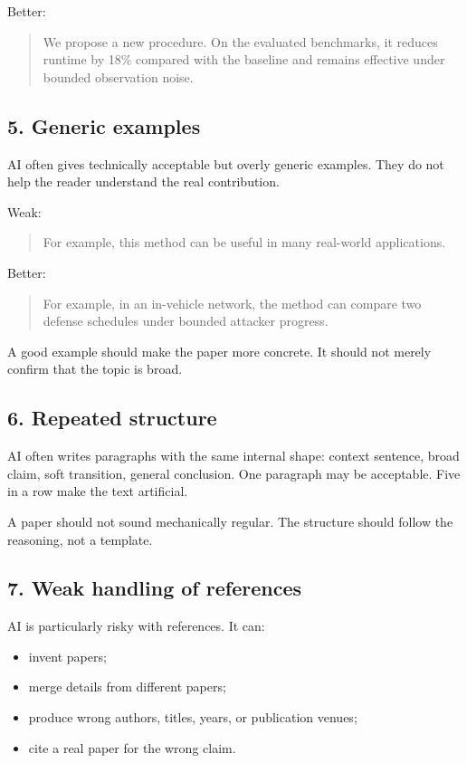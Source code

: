\documentclass[11pt,a4paper]{article}
\theoremstyle{definition}
\begin{document}
Better:
\begin{quote}
We propose a new procedure. On the evaluated benchmarks, it reduces runtime by 18\% compared with the baseline and remains effective under bounded observation noise.
\end{quote}

\subsection*{5. Generic examples}

AI often gives technically acceptable but overly generic examples. They do not help the reader understand the real contribution.

Weak:
\begin{quote}
For example, this method can be useful in many real-world applications.
\end{quote}

Better:
\begin{quote}
For example, in an in-vehicle network, the method can compare two defense schedules under bounded attacker progress.
\end{quote}

A good example should make the paper more concrete. It should not merely confirm that the topic is broad.

\subsection*{6. Repeated structure}

AI often writes paragraphs with the same internal shape:
context sentence, broad claim, soft transition, general conclusion.
One paragraph may be acceptable. Five in a row make the text artificial.

A paper should not sound mechanically regular. The structure should follow the reasoning, not a template.

\subsection*{7. Weak handling of references}

AI is particularly risky with references.
It can:
\begin{itemize}
    \item invent papers;
    \item merge details from different papers;
    \item produce wrong authors, titles, years, or publication venues;
    \item cite a real paper for the wrong claim.
\end{itemize}
\end{document}
